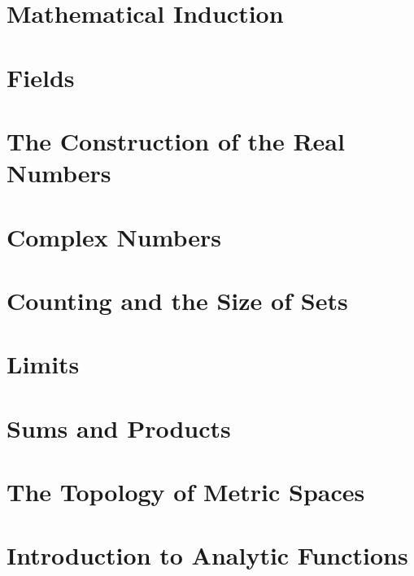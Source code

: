 \documentclass{report}
\begin{document}
\chapter{Mathematical Induction}
\chapter{Fields}
\chapter{The Construction of the Real Numbers}
\chapter{Complex Numbers}
\chapter{Counting and the Size of Sets}
\chapter{Limits}
\chapter{Sums and Products}
\chapter{The Topology of Metric Spaces}
\chapter{Introduction to Analytic Functions}
\end{document}
